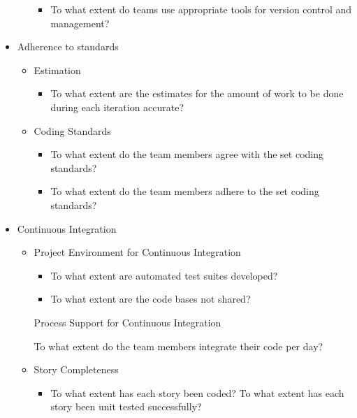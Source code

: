 \begin{itemize}
\begin{itemize}
				\begin{itemize}
					\item To what extent do teams use appropriate tools for version control and management?
				\end{itemize}
		\end{itemize}
	\item Adherence to standards
		\begin{itemize}
			\item Estimation
				\begin{itemize}
					\item To what extent are the estimates for the amount of work to be done during each iteration accurate?
				\end{itemize}
			\item Coding Standards
				\begin{itemize}
					\item To what extent do the team members agree with the set coding standards? 
					\item To what extent do the team members adhere to the set coding standards?
				\end{itemize}
		\end{itemize}
	\item Continuous Integration
		\begin{itemize}
			\item Project Environment for Continuous Integration 
				\begin{itemize}
					\item To what extent are automated test suites developed?
					\item To what extent are the code bases not shared?
				\end{itemize}
			\indicatorAddition Process Support for Continuous Integration
				\begin{itemize}
							\addition To what extent do the team members integrate their code per day?
				\end{itemize}
			\item Story Completeness
				\begin{itemize}
					\item To what extent has each story been coded? 
					\addition To what extent has each story been unit tested successfully?

\end{itemize}
\end{itemize}
\end{itemize}
